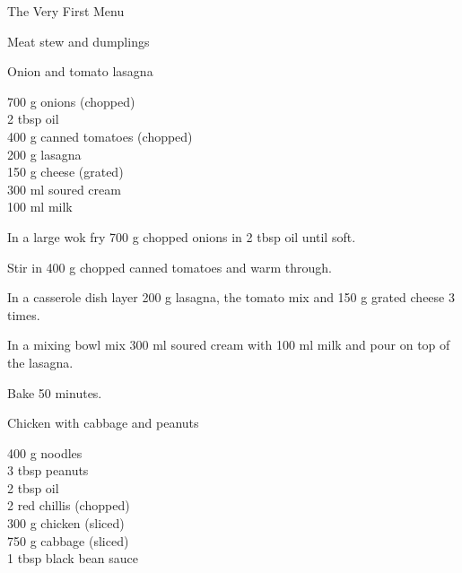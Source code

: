 \begin{menu}{The Very First Menu}
\begin{recipe}{2}{Meat stew and dumplings}
\begin{instructions}
    \end{instructions}
    \end{recipe}%
  
    \begin{recipe}{2}{Onion and tomato lasagna}%
    
		\begin{ingredients}
		700 g onions (chopped) \\
	2 tbsp oil  \\
	400 g canned tomatoes (chopped) \\
	200 g lasagna  \\
	150 g cheese (grated) \\
	300 ml soured cream  \\
	100 ml milk  \\
	
		\end{ingredients}
	
    \begin{instructions}
    \item 
				In a large wok fry
				700 g chopped onions
				in
				2 tbsp  oil
				until soft.
			\item 
				Stir in 400 g chopped canned tomatoes
				and warm through.
			\item 
				In a casserole dish layer
				200 g  lasagna,
				the tomato mix and
				150 g grated cheese
				3 times.
			\item 
				In a mixing bowl mix
				300 ml  soured cream
				with
				100 ml  milk
				and pour on top of the lasagna.
			\item 
				Bake  50 minutes.
			
    \end{instructions}
    \end{recipe}%
  
    \begin{recipe}{2}{Chicken with cabbage and peanuts}%
    
		\begin{ingredients}
		400 g noodles  \\
	3 tbsp peanuts  \\
	2 tbsp oil  \\
	2  red chillis (chopped) \\
	300 g chicken (sliced) \\
	750 g cabbage (sliced) \\
	1 tbsp black bean sauce  \\
	
		\end{ingredients}
	

\end{recipe}
\end{menu}
